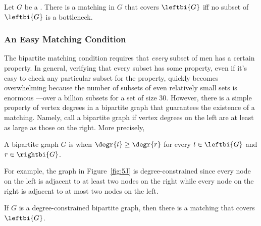 \begin{theorem}\label{thm:halls}
  Let $G$ be a .  There is a matching in $G$ that
  covers $\leftbi{G}$ iff no subset of $\leftbi{G}$ is a bottleneck.
\end{theorem}

\subsubsection{An Easy Matching Condition}

The bipartite matching condition requires that \emph{every} subset of
men has a certain property.  In general, verifying that every subset
has some property, even if it's easy to check any particular subset
for the property, quickly becomes overwhelming because the number of
subsets of even relatively small sets is enormous ---over a billion
subsets for a set of size 30.  However, there is a simple property of
vertex degrees in a bipartite graph that guarantees the existence of a
matching.  Namely, call a bipartite graph 
if vertex degrees on the left are at least as large as those on the
right.  More precisely,

\begin{definition}\label{degree-constrained_def}
  A bipartite graph $G$ is  when $\degr{l} \geq
  \degr{r}$ for every $l \in \leftbi{G}$ and $r \in \rightbi{G}$.
\end{definition}

For example, the graph in Figure~\ref{fig:5J} is degree-constrained
since every node on the left is adjacent to at least two nodes on the
right while every node on the right is adjacent to at most two nodes
on the left.

\begin{theorem}\label{lem:no_bottleneck_degree_constrained}
  If $G$ is a degree-constrained bipartite graph, then there is a matching
  that covers~$\leftbi{G}$.
\end{theorem}

